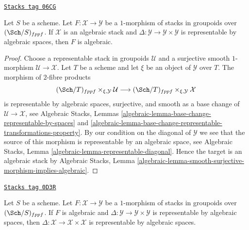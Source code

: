 \begin{lemma}
\label{criteria-lemma-map-from-algebraic}
\href{https://stacks.math.columbia.edu/tag/06CG}{\texttt{Stacks tag 06CG}}

Let $S$ be a scheme. Let $F : \mathcal{X} \to \mathcal{Y}$ be a $1$-morphism
of stacks in groupoids over $(\Sch/S)_{fppf}$. If $\mathcal{X}$ is an
algebraic stack and $\Delta : \mathcal{Y} \to \mathcal{Y} \times \mathcal{Y}$
is representable by algebraic spaces, then $F$ is algebraic.
\end{lemma}

\begin{proof}
Choose a representable stack in groupoids $\mathcal{U}$ and a surjective
smooth $1$-morphism $\mathcal{U} \to \mathcal{X}$. Let $T$ be a scheme and
let $\xi$ be an object of $\mathcal{Y}$ over $T$. The morphism of
$2$-fibre products
$$
(\Sch/T)_{fppf} \times_{\xi, \mathcal{Y}} \mathcal{U}
\longrightarrow
(\Sch/T)_{fppf} \times_{\xi, \mathcal{Y}} \mathcal{X}
$$
is representable by algebraic spaces, surjective, and smooth as a
base change of $\mathcal{U} \to \mathcal{X}$, see
Algebraic Stacks,
Lemmas \ref{algebraic-lemma-base-change-representable-by-spaces} and
\ref{algebraic-lemma-base-change-representable-transformations-property}.
By our condition on the diagonal of $\mathcal{Y}$ we see that
the source of this morphism is representable by an algebraic space, see
Algebraic Stacks, Lemma \ref{algebraic-lemma-representable-diagonal}.
Hence the target is an algebraic stack by
Algebraic Stacks,
Lemma \ref{algebraic-lemma-smooth-surjective-morphism-implies-algebraic}.
\end{proof}

\begin{lemma}
\label{criteria-lemma-diagonals-and-algebraic-morphisms}
\href{https://stacks.math.columbia.edu/tag/0D3R}{\texttt{Stacks tag 0D3R}}

Let $S$ be a scheme. Let $F : \mathcal{X} \to \mathcal{Y}$ be a $1$-morphism
of stacks in groupoids over $(\Sch/S)_{fppf}$.
If $F$ is algebraic and
$\Delta : \mathcal{Y} \to \mathcal{Y} \times \mathcal{Y}$
is representable by algebraic spaces, then
$\Delta : \mathcal{X} \to \mathcal{X} \times \mathcal{X}$
is representable by algebraic spaces.
\end{lemma}

